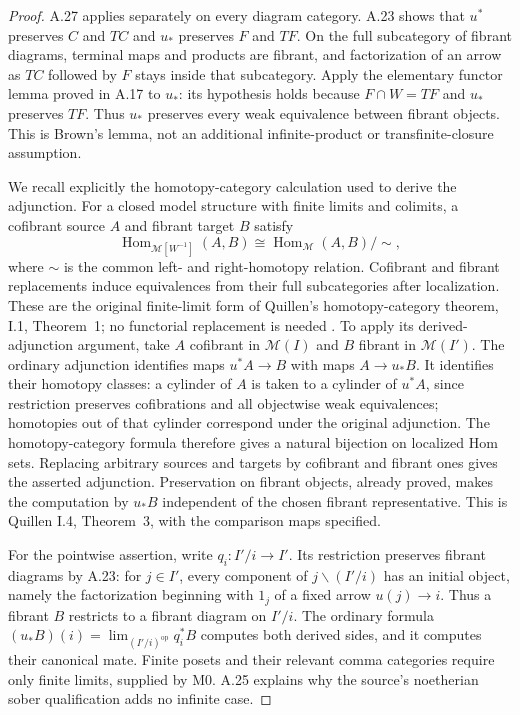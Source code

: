 \begin{proof}
A.27 applies separately on every diagram category. A.23 shows that $u^*$ preserves $C$ and $TC$ and $u_*$ preserves $F$ and $TF$. On the full subcategory of fibrant diagrams, terminal maps and products are fibrant, and factorization of an arrow as $TC$ followed by $F$ stays inside that subcategory. Apply the elementary functor lemma proved in A.17 to $u_*$: its hypothesis holds because $F\cap W=TF$ and $u_*$ preserves $TF$. Thus $u_*$ preserves every weak equivalence between fibrant objects. This is Brown's lemma, not an additional infinite-product or transfinite-closure assumption.

We recall explicitly the homotopy-category calculation used to derive the adjunction. For a closed model structure with finite limits and colimits, a cofibrant source $A$ and fibrant target $B$ satisfy
\[
\operatorname{Hom}_{\mathcal M[W^{-1}]}(A,B)
\cong \operatorname{Hom}_{\mathcal M}(A,B)/\!\sim,
\]
where $\sim$ is the common left- and right-homotopy relation. Cofibrant and fibrant replacements induce equivalences from their full subcategories after localization. These are the original finite-limit form of Quillen's homotopy-category theorem, I.1, Theorem~1; no functorial replacement is needed \citep{BISITEQuillen1967}. To apply its derived-adjunction argument, take $A$ cofibrant in $\mathcal M(I)$ and $B$ fibrant in $\mathcal M(I')$. The ordinary adjunction identifies maps $u^*A\to B$ with maps $A\to u_*B$. It identifies their homotopy classes: a cylinder of $A$ is taken to a cylinder of $u^*A$, since restriction preserves cofibrations and all objectwise weak equivalences; homotopies out of that cylinder correspond under the original adjunction. The homotopy-category formula therefore gives a natural bijection on localized Hom sets. Replacing arbitrary sources and targets by cofibrant and fibrant ones gives the asserted adjunction. Preservation on fibrant objects, already proved, makes the computation by $u_*B$ independent of the chosen fibrant representative. This is Quillen I.4, Theorem~3, with the comparison maps specified.

For the pointwise assertion, write $q_i:I'/i\to I'$. Its restriction preserves fibrant diagrams by A.23: for $j\in I'$, every component of $j\backslash(I'/i)$ has an initial object, namely the factorization beginning with $1_j$ of a fixed arrow $u(j)\to i$. Thus a fibrant $B$ restricts to a fibrant diagram on $I'/i$. The ordinary formula $(u_*B)(i)=\lim_{(I'/i)^{\mathrm{op}}}q_i^*B$ computes both derived sides, and it computes their canonical mate. Finite posets and their relevant comma categories require only finite limits, supplied by M0. A.25 explains why the source's noetherian sober qualification adds no infinite case.
\end{proof}

